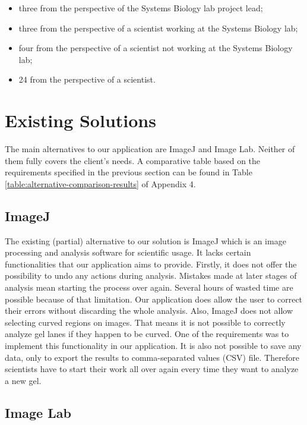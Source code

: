\begin{itemize}
    \item three from the perspective of the Systems Biology lab project lead;
    \item three from the perspective of a scientist working at the Systems Biology lab;
    \item four from the perspective of a scientist not working at the Systems Biology lab;
    \item 24 from the perspective of a scientist.
\end{itemize}

\section{Existing Solutions}

The main alternatives to our application are ImageJ and Image Lab. Neither of them fully covers the client's needs. A comparative table based on the requirements specified in the previous section can be found in Table \ref{table:alternative-comparison-results} of Appendix 4.

\subsection{ImageJ}

The existing (partial) alternative to our solution is ImageJ which is an image processing and analysis software for scientific usage. It lacks certain functionalities that our application aims to provide. 
Firstly, it does not offer the possibility to undo any actions during analysis. Mistakes made at later stages of analysis mean starting the process over again. Several hours of wasted time are possible because of that limitation. Our application does allow the user to correct their errors without discarding the whole analysis.
Also, ImageJ does not allow selecting curved regions on images. That means it is not possible to correctly analyze gel lanes if they happen to be curved. One of the requirements was to implement this functionality in our application.
It is also not possible to save any data, only to export the results to comma-separated values (CSV) file. Therefore scientists have to start their work all over again every time they want to analyze a new gel.

\subsection{Image Lab}

